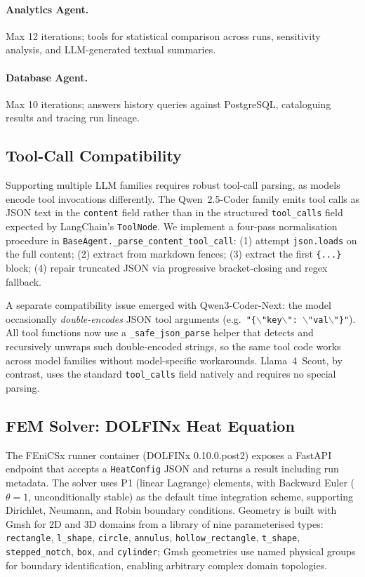 \documentclass[preprint,review,12pt]{elsarticle}
\begin{document}
\paragraph{Analytics Agent.}
Max 12 iterations; tools for statistical comparison across runs,
sensitivity analysis, and LLM-generated textual summaries.

\paragraph{Database Agent.}
Max 10 iterations; answers history queries against PostgreSQL,
cataloguing results and tracing run lineage.

\subsection{Tool-Call Compatibility}
\label{sec:tool-compat}

Supporting multiple LLM families requires robust tool-call parsing, as
models encode tool invocations differently.  The Qwen~2.5-Coder family
emits tool calls as JSON text in the \texttt{content} field rather than in
the structured \texttt{tool\_calls} field expected by LangChain's
\texttt{ToolNode}.  We implement a four-pass normalisation procedure in
\texttt{BaseAgent.\_parse\_content\_tool\_call}:
(1) attempt \texttt{json.loads} on the full content;
(2) extract from markdown fences;
(3) extract the first \texttt{\{...\}} block;
(4) repair truncated JSON via progressive bracket-closing and regex fallback.

A separate compatibility issue emerged with Qwen3-Coder-Next: the model
occasionally \emph{double-encodes} JSON tool arguments (e.g.\
\texttt{"\{$\backslash$"key$\backslash$": $\backslash$"val$\backslash$"\}"}).
All tool functions now use a \texttt{\_safe\_json\_parse} helper that detects
and recursively unwraps such double-encoded strings, so the same tool code
works across model families without model-specific workarounds.
Llama~4~Scout, by contrast, uses the standard \texttt{tool\_calls} field
natively and requires no special parsing.

\subsection{FEM Solver: DOLFINx Heat Equation}

The FEniCSx runner container (DOLFINx 0.10.0.post2) exposes a FastAPI
endpoint that accepts a \texttt{HeatConfig} JSON and returns a result
including run metadata.  The solver uses P1 (linear Lagrange) elements,
with Backward Euler ($\theta = 1$, unconditionally stable) as the default
time integration scheme, supporting Dirichlet, Neumann, and Robin boundary
conditions.  Geometry is built with Gmsh \citep{geuzaine2009gmsh} for 2D
and 3D domains from a library of nine parameterised types: \texttt{rectangle},
\texttt{l\_shape}, \texttt{circle}, \texttt{annulus}, \texttt{hollow\_rectangle},
\texttt{t\_shape}, \texttt{stepped\_notch}, \texttt{box}, and \texttt{cylinder};
Gmsh geometries use named physical groups for boundary identification,
enabling arbitrary complex domain topologies.
\end{document}
